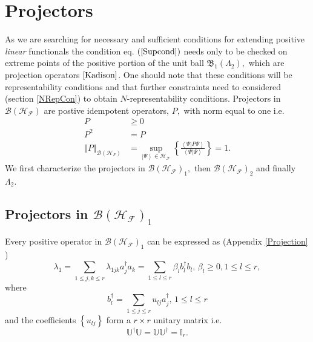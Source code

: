 \documentclass[aps,preprint,amsfonts,amssymb,showpacs,showkeys]{revtex4}%
\begin{document}
\section{Projectors \label{Projectors}}

As we are searching for necessary and sufficient conditions for extending
positive \emph{linear} functionals the condition eq. $\left(  \ref{Supcond}%
\right)  $ needs only to be checked on extreme points of the positive portion
of the unit ball $\mathfrak{B}_{1}\left(  \Lambda_{2}\right)  ,$ which are
projection operators $\cite{Kadison}$. One should note that these conditions
will be representability conditions and that further constraints need to
considered (section \ref{NRepCon}) to obtain $N$-representability conditions.
Projectors in $\mathcal{B}\left(  \mathcal{H}_{\mathcal{F}}\right)  $ are
postive idempotent operators, $P,$ with norm equal to one i.e.
\begin{align}
P  &  \geq0\nonumber\\
P^{2}  &  =P\nonumber\\
\left\Vert P\right\Vert _{\mathcal{B}\left(  \mathcal{H}_{F}\right)  }  &
=\sup_{\left\vert \Psi\right\rangle \in\mathcal{H}_{\mathcal{F}}}\left\{
\frac{\left\langle \Psi\left\vert P\Psi\right.  \right\rangle }{\left\langle
\Psi\left\vert \Psi\right.  \right\rangle }\right\}  =1.
\end{align}
We first characterize the projectors in $\mathcal{B}\left(  \mathcal{H}%
_{\mathcal{F}}\right)  _{1},$ then $\mathcal{B}\left(  \mathcal{H}%
_{\mathcal{F}}\right)  _{2}$ and finally $\Lambda_{2}.$

\subsection{Projectors in $\mathcal{B}\left(  \mathcal{H}_{\mathcal{F}%
}\right)  _{1}$}

Every positive operator in $\mathcal{B}\left(  \mathcal{H}_{\mathcal{F}%
}\right)  _{1}$ can be expressed as (Appendix \ref{Projection} )
\begin{equation}
\lambda_{1}=\sum_{1\leq j,k\leq r}\lambda_{1jk}a_{j}^{\dagger}a_{k}%
=\sum_{1\leq l\leq r}\beta_{l}b_{l}^{\dagger}b_{l},\,\beta_{l}\geq0,1\leq
l\leq r, \label{1par}%
\end{equation}
where
\begin{equation}
b_{l}^{\dagger}=\sum_{1\leq j\leq r}u_{lj}a_{j}^{\dagger},\,1\leq l\leq r
\end{equation}
and the coefficients $\left\{  u_{lj}\right\}  $ form a $r\times r$ unitary
matrix i.e.
\begin{equation}
\mathbb{U}^{\dagger}\mathbb{U}=\mathbb{UU}^{\dagger}=\mathbb{I}_{r}.
\end{equation}
\end{document}
